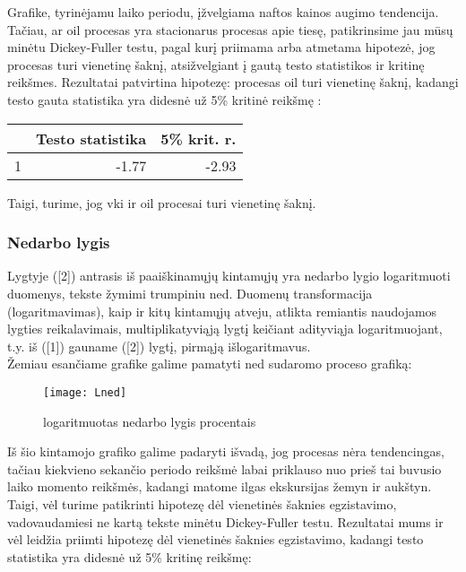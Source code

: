 \documentclass[a4paper]{article}
\begin{document}
\noindent Grafike, tyrinėjamu laiko periodu, įžvelgiama naftos kainos augimo tendencija. Tačiau, ar oil procesas yra stacionarus procesas apie tiesę, patikrinsime jau mūsų minėtu Dickey-Fuller testu, pagal kurį priimama arba atmetama hipotezė, jog procesas turi vienetinę šaknį, atsižvelgiant į gautą testo statistikos ir kritinę reikšmes. Rezultatai patvirtina hipotezę: procesas oil turi vienetinę šaknį, kadangi testo gauta statistika yra didesnė už 5\% kritinė reikšmę :

\begin{table}[!h]
\begin{center}
\begin{tabular}{rrr}
  \hline
 & Testo statistika & 5\% krit. r. \\ 
  \hline
1 & -1.77 & -2.93 \\ 
   \hline
\end{tabular}
\end{center}
\end{table}

\noindent Taigi, turime, jog vki ir oil procesai turi vienetinę šaknį.
		
\newpage \subsubsection{Nedarbo lygis}

Lygtyje ([2]) antrasis iš paaiškinamųjų kintamųjų yra nedarbo lygio logaritmuoti duomenys, tekste žymimi trumpiniu ned. Duomenų transformacija (logaritmavimas), kaip ir kitų kintamųjų atveju, atlikta remiantis naudojamos lygties reikalavimais,  multiplikatyviąją lygtį keičiant adityviąja logaritmuojant, t.y. iš ([1]) gauname ([2]) lygtį, pirmąją išlogaritmavus.\\ Žemiau esančiame grafike galime pamatyti ned sudaromo proceso grafiką:

\begin{figure}[!h]
\centering
\texttt{[image: Lned]}
\caption{logaritmuotas nedarbo lygis procentais}
\end{figure}

\noindent Iš šio kintamojo grafiko galime padaryti išvadą, jog procesas nėra tendencingas, tačiau kiekvieno sekančio periodo reikšmė labai priklauso nuo prieš tai buvusio laiko momento reikšmės, kadangi matome ilgas ekskursijas žemyn ir aukštyn. Taigi,  vėl turime patikrinti hipotezę dėl vienetinės šaknies egzistavimo, vadovaudamiesi ne kartą tekste minėtu Dickey-Fuller testu. Rezultatai mums ir vėl leidžia priimti hipotezę dėl vienetinės šaknies egzistavimo, kadangi testo statistika yra didesnė už 5\% kritinę reikšmę:
\end{document}
